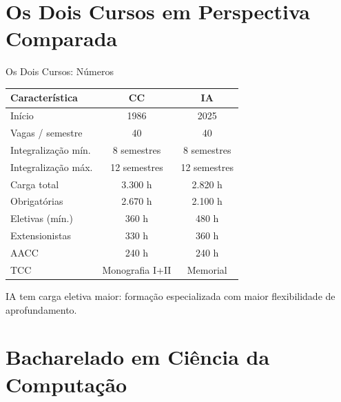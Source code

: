 \documentclass[aspectratio=169]{beamer}
\newcommand{\ntc}[1]{\textcolor{mblue}{#1}}
\newcommand{\cc}[1]{\textcolor{mcc}{\textbf{#1}}}
\newcommand{\ia}[1]{\textcolor{mia}{\textbf{#1}}}
\begin{document}
\section{Os Dois Cursos em Perspectiva Comparada}
\centering
\begin{frame}{Os Dois Cursos: Números}
  \vspace{0.2cm}
  \renewcommand{\arraystretch}{1.3}
  \begin{tabular}{lcc}
    \toprule
    \textbf{Característica} & \cc{CC} & \ia{IA} \\
    \midrule
    Início              & 1986          & 2025 \\
    Vagas / semestre    & 40            & 40 \\
    Integralização mín. & 8 semestres   & 8 semestres \\
    Integralização máx. & 12 semestres  & 12 semestres \\
    Carga total         & 3.300 h       & 2.820 h \\
    Obrigatórias        & 2.670 h       & 2.100 h \\
    Eletivas (mín.)     & 360 h         & 480 h \\
    Extensionistas      & 330 h         & 360 h \\
    AACC                & 240 h         & 240 h \\
    TCC                 & Monografia I+II & Memorial\\
    \bottomrule
  \end{tabular}
  \vspace{0.2cm}

  \ntc{IA tem carga eletiva maior: formação especializada com maior flexibilidade de aprofundamento.}
\end{frame}

\section{Bacharelado em Ciência da Computação}
\end{document}
